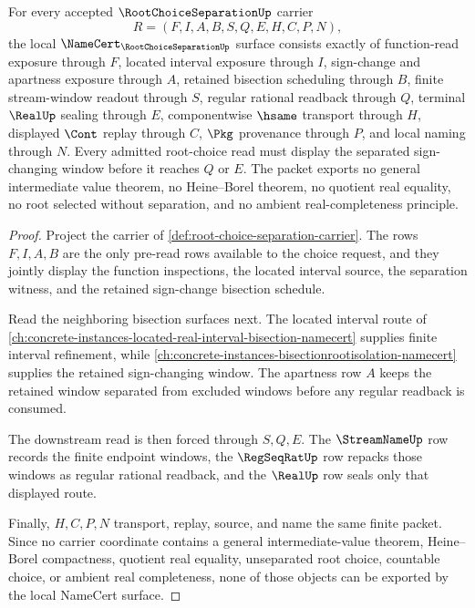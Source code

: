 \begin{theorem}
\label{thm:root-choice-separation-namecert}
For every accepted $\RootChoiceSeparationUp$ carrier
$$
R=(F,I,A,B,S,Q,E,H,C,P,N),
$$
the local $\NameCert_{\RootChoiceSeparationUp}$ surface consists exactly of function-read exposure through $F$, located interval exposure through $I$, sign-change and apartness exposure through $A$, retained bisection scheduling through $B$, finite stream-window readout through $S$, regular rational readback through $Q$, terminal $\RealUp$ sealing through $E$, componentwise $\hsame$ transport through $H$, displayed $\Cont$ replay through $C$, $\Pkg$ provenance through $P$, and local naming through $N$. Every admitted root-choice read must display the separated sign-changing window before it reaches $Q$ or $E$. The packet exports no general intermediate value theorem, no Heine--Borel theorem, no quotient real equality, no root selected without separation, and no ambient real-completeness principle.
\end{theorem}
\begin{proof}
Project the carrier of \autoref{def:root-choice-separation-carrier}. The rows $F,I,A,B$ are the only pre-read rows available to the choice request, and they jointly display the function inspections, the located interval source, the separation witness, and the retained sign-change bisection schedule.

Read the neighboring bisection surfaces next. The located interval route of \autoref{ch:concrete-instances-located-real-interval-bisection-namecert} supplies finite interval refinement, while \autoref{ch:concrete-instances-bisectionrootisolation-namecert} supplies the retained sign-changing window. The apartness row $A$ keeps the retained window separated from excluded windows before any regular readback is consumed.

The downstream read is then forced through $S,Q,E$. The $\StreamNameUp$ row records the finite endpoint windows, the $\RegSeqRatUp$ row repacks those windows as regular rational readback, and the $\RealUp$ row seals only that displayed route.

Finally, $H,C,P,N$ transport, replay, source, and name the same finite packet. Since no carrier coordinate contains a general intermediate-value theorem, Heine--Borel compactness, quotient real equality, unseparated root choice, countable choice, or ambient real completeness, none of those objects can be exported by the local NameCert surface.
\end{proof}

